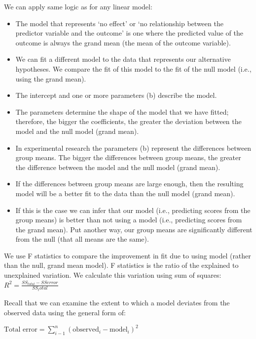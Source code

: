 We can apply same logic as for any linear model:
\begin{itemize}
\item The model that represents ‘no effect’ or ‘no relationship between the predictor 
variable and the outcome’ is one where the predicted value of the outcome is always
the grand mean (the mean of the outcome variable).
\item We can fit a different model to the data that represents our alternative hypotheses.
We compare the fit of this model to the fit of the null model (i.e., using the grand
mean).
\item The intercept and one or more parameters (b) describe the model.
\item The parameters determine the shape of the model that we have fitted; therefore, the
bigger the coefficients, the greater the deviation between the model and the null
model (grand mean).
\item In experimental research the parameters (b) represent the differences between group
means. The bigger the differences between group means, the greater the difference
between the model and the null model (grand mean).
\item If the differences between group means are large enough, then the resulting model
will be a better fit to the data than the null model (grand mean).
\item If this is the case we can infer that our model (i.e., predicting scores from the group
means) is better than not using a model (i.e., predicting scores from the grand mean).
Put another way, our group means are significantly different from the null (that all means are the same).
\end{itemize}

We use F statistics to compare the improvement in fit due to using model (rather than the null, grand mean model). F statistics is the ratio of the explained to unexplained variation. We calculate this variation using sum of squares: $R^2 = \frac{SS_{total} - SS{error}}{SS_total}$

Recall that we can examine the extent to which a model deviates from the observed data using the general form of:
\begin{center}
$\text{Total error} = \sum^n_{i-1} (\text{observed}_i - \text{model}_i)^2$
\end{center}

